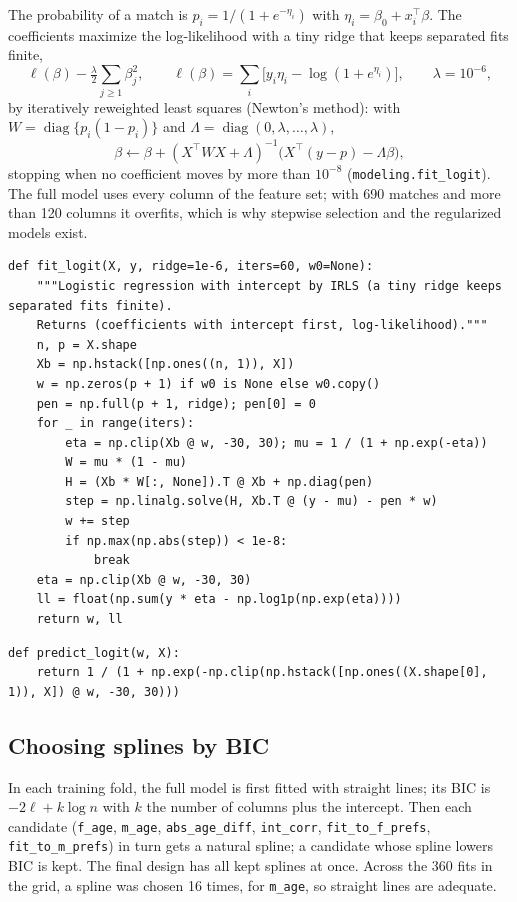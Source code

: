 \documentclass[11pt]{article}
\begin{document}
The probability of a match is $p_i = 1/(1 + e^{-\eta_i})$ with $\eta_i = \beta_0 + x_i^\top\beta$. The coefficients
maximize the log-likelihood with a tiny ridge that keeps separated fits finite,
\[
\ell(\beta) - \tfrac{\lambda}{2}\sum_{j\ge1}\beta_j^2,\qquad
\ell(\beta) = \sum_i \big[y_i\eta_i - \log(1 + e^{\eta_i})\big],\qquad \lambda = 10^{-6},
\]
by iteratively reweighted least squares (Newton's method): with $W = \operatorname{diag}\{p_i(1-p_i)\}$ and
$\Lambda = \operatorname{diag}(0, \lambda, \dots, \lambda)$,
\[
\beta \leftarrow \beta + (X^\top W X + \Lambda)^{-1}\big(X^\top(y - p) - \Lambda\beta\big),
\]
stopping when no coefficient moves by more than $10^{-8}$ (\texttt{modeling.fit\_logit}). The full model uses every
column of the feature set; with 690 matches and more than 120 columns it overfits, which is why stepwise selection
and the regularized models exist.

\begin{lstlisting}[caption={Logistic regression by IRLS (scripts/modeling.py)}]
def fit_logit(X, y, ridge=1e-6, iters=60, w0=None):
    """Logistic regression with intercept by IRLS (a tiny ridge keeps separated fits finite).
    Returns (coefficients with intercept first, log-likelihood)."""
    n, p = X.shape
    Xb = np.hstack([np.ones((n, 1)), X])
    w = np.zeros(p + 1) if w0 is None else w0.copy()
    pen = np.full(p + 1, ridge); pen[0] = 0
    for _ in range(iters):
        eta = np.clip(Xb @ w, -30, 30); mu = 1 / (1 + np.exp(-eta))
        W = mu * (1 - mu)
        H = (Xb * W[:, None]).T @ Xb + np.diag(pen)
        step = np.linalg.solve(H, Xb.T @ (y - mu) - pen * w)
        w += step
        if np.max(np.abs(step)) < 1e-8:
            break
    eta = np.clip(Xb @ w, -30, 30)
    ll = float(np.sum(y * eta - np.log1p(np.exp(eta))))
    return w, ll
\end{lstlisting}

\begin{lstlisting}[caption={Predicted probabilities (scripts/modeling.py)}]
def predict_logit(w, X):
    return 1 / (1 + np.exp(-np.clip(np.hstack([np.ones((X.shape[0], 1)), X]) @ w, -30, 30)))
\end{lstlisting}

\subsection{Choosing splines by BIC}\label{sec:spline}

In each training fold, the full model is first fitted with straight lines; its BIC is $-2\ell + k\log n$ with $k$ the number of columns plus the intercept. Then each candidate (\texttt{f\_age}, \texttt{m\_age}, \texttt{abs\_age\_diff}, \texttt{int\_corr}, \texttt{fit\_to\_f\_prefs}, \texttt{fit\_to\_m\_prefs}) in turn gets a natural spline; a candidate whose spline lowers BIC is kept. The final design has all kept splines at once. Across the 360 fits in the grid, a spline was chosen 16 times, for \texttt{m\_age}, so straight lines are adequate.
\end{document}
